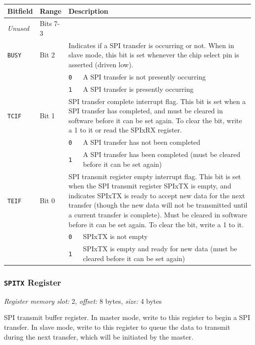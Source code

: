 \begin{tabularx}{\textwidth}{ l l l X }
\textbf{Bitfield} & \textbf{Range} & \multicolumn{2}{X}{\textbf{Description}} \\ \hline
\textit{Unused} & Bits 7-3 & \multicolumn{2}{X}{} \\
\hline
\texttt{BUSY} & Bit 2 & \multicolumn{2}{X}{Indicates if a SPI transfer is occurring or not. When in slave mode, this bit is set whenever the chip select pin is asserted (driven low).} \\
 & & \texttt{0} & A SPI transfer is not presently occurring \\
 & & \cellcolor{tablehighlightcolor}\texttt{1} & \cellcolor{tablehighlightcolor}A SPI transfer is presently occurring \\
\hline
\texttt{TCIF} & Bit 1 & \multicolumn{2}{X}{SPI transfer complete interrupt flag. This bit is set when a SPI transfer has completed, and must be cleared in software before it can be set again. To clear the bit, write a 1 to it or read the SPIxRX register.} \\
 & & \texttt{0} & A SPI transfer has not been completed \\
 & & \cellcolor{tablehighlightcolor}\texttt{1} & \cellcolor{tablehighlightcolor}A SPI transfer has been completed (must be cleared before it can be set again) \\
\hline
\texttt{TEIF} & Bit 0 & \multicolumn{2}{X}{SPI transmit register empty interrupt flag. This bit is set when the SPI transmit register SPIxTX is empty, and indicates SPIxTX is ready to accept new data for the next transfer (though the new data will not be transmitted until a current transfer is complete). Must be cleared in software before it can be set again. To clear the bit, write a 1 to it.} \\
 & & \texttt{0} & SPIxTX is not empty \\
 & & \cellcolor{tablehighlightcolor}\texttt{1} & \cellcolor{tablehighlightcolor}SPIxTX is empty and ready for new data (must be cleared before it can be set again) \\
\hline
\end{tabularx}

\subsubsection{\texttt{SPITX} Register} \label{ss:SPIxTX}
\noindent \textit{Register memory slot:} 2, \textit{offset:} 8 bytes, \textit{size:} 4 bytes

\noindent SPI transmit buffer register. In master mode, write to this register to begin a SPI transfer. In slave mode, write to this register to queue the data to transmit during the next transfer, which will be initiated by the master.

